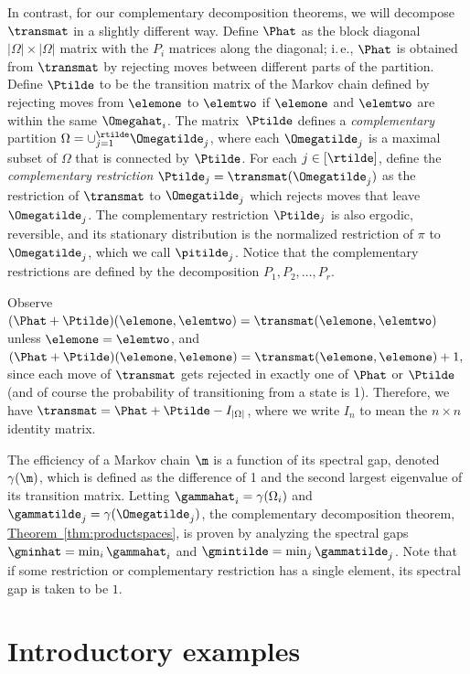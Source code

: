 \documentclass[11pt]{article}
\providecommand{\ie}{i.\,e.}
\providecommand{\expref}[2]{\texorpdfstring{\hyperref[#2]{#1~\ref{#2}}}{#1~\ref{#2}}}
\begin{document}
In contrast, for our complementary decomposition theorems,
we will decompose $\transmat$ in a slightly different way.
Define $\Phat$ as the block diagonal $|\Omega|\times |\Omega|$ matrix 
with the $P_i$ matrices along the diagonal; \ie,  $\Phat$ is 
obtained from $\transmat$ by rejecting moves between different parts of 
the partition.
Define $\Ptilde$ to be the transition matrix of the 
Markov chain defined by rejecting moves from $\elemone$ to $\elemtwo$ 
if $\elemone$ and $\elemtwo$ are within the same $\Omegahat_i$.  
The matrix~$\Ptilde$ 
defines a \emph{complementary} partition $\Omega = \cup_{j=1}^{\rtilde} 
\Omegatilde_j$, where each $\Omegatilde_j$ is a maximal subset of 
$\Omega$ that is connected 
by $\Ptilde$. For each $j\in [\rtilde]$, define the \emph{complementary 
restriction} $\Ptilde_{j} = \transmat(\Omegatilde_j)$ as the 
restriction of $\transmat$ to $\Omegatilde_j$ which rejects moves that 
leave $\Omegatilde_j$. The complementary restriction $\Ptilde_j$ is 
also ergodic, reversible, and its stationary distribution is the normalized restriction 
of $\pi$ to $\Omegatilde_j$, which we call $\pitilde_j$.
Notice that 
the complementary restrictions are defined by the decomposition 
$P_1,P_2,\ldots, P_r$.

Observe $(\Phat+\Ptilde)(\elemone,\elemtwo)=\transmat(\elemone,\elemtwo)$ 
unless $\elemone=\elemtwo$, and 
$(\Phat+\Ptilde)(\elemone,\elemone)=\transmat(\elemone,\elemone)+1,$ 
since each move of $\transmat$ gets rejected in exactly one of $\Phat$ 
or $\Ptilde$ (and of course the probability of transitioning from a 
state is 1).  Therefore, we have $\transmat = 
\Phat+\Ptilde-I_{|\Omega|}$, where we write $I_n$ to 
mean the $n \times n$ identity matrix. 

The efficiency of a Markov chain $\m$ is a function of its spectral 
gap, denoted $\gamma(\m)$, which is defined as the difference of 1 and 
the second largest eigenvalue of its transition matrix. Letting 
$\gammahat_i = \gamma(\Omega_i)$ and $\gammatilde_j = 
\gamma(\Omegatilde_j)$, the complementary decomposition theorem, 
\expref{Theorem}{thm:productspaces}, is proven by analyzing the spectral 
gaps $\gminhat=\min_i \gammahat_i$ and $\gmintilde=\min_j 
\gammatilde_j$.  Note that if some restriction or complementary 
restriction has a single element, its spectral gap is taken to be $1$.


\section{Introductory examples}\label{sec:decompThm} 
\end{document}
